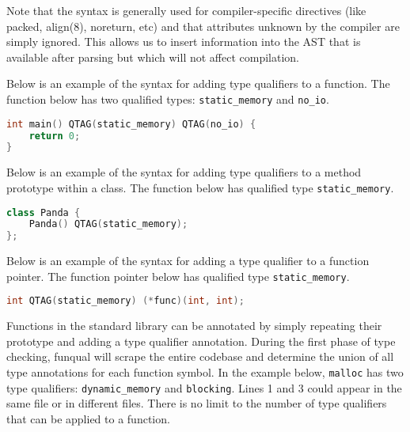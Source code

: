 Note that the  syntax is generally used for compiler-specific directives (like packed, align(8), noreturn, etc) and that attributes unknown by the compiler are simply ignored.  This allows us to insert information into the AST that is available after parsing but which will not affect compilation.

Below is an example of the syntax for adding type qualifiers to a function.  The function below has two qualified types: \lstinline{static_memory} and \lstinline{no_io}.

\noindent\begin{minipage}[t]{\linewidth}
\begin{lstlisting}[language=C]
int main() QTAG(static_memory) QTAG(no_io) {
    return 0;
}
\end{lstlisting}
\end{minipage}

Below is an example of the syntax for adding type qualifiers to a method prototype within a class.  The function below has qualified type \lstinline{static_memory}.

\noindent\begin{minipage}[t]{\linewidth}
\begin{lstlisting}[language=C++]
class Panda {
    Panda() QTAG(static_memory);
};
\end{lstlisting}
\end{minipage}

Below is an example of the syntax for adding a type qualifier to a function pointer.  The function pointer below has qualified type \lstinline{static_memory}.

\noindent\begin{minipage}[t]{\linewidth}
\begin{lstlisting}[language=C++]
int QTAG(static_memory) (*func)(int, int);
\end{lstlisting}
\end{minipage}

Functions in the standard library can be annotated by simply repeating their prototype and adding a type qualifier annotation.  During the first phase of type checking, funqual will scrape the entire codebase and determine the union of all type annotations for each function symbol.  In the example below, \lstinline{malloc} has two type qualifiers:  \lstinline{dynamic_memory} and \lstinline{blocking}.  Lines 1 and 3 could appear in the same file or in different files.  There is no limit to the number of type qualifiers that can be applied to a function.

